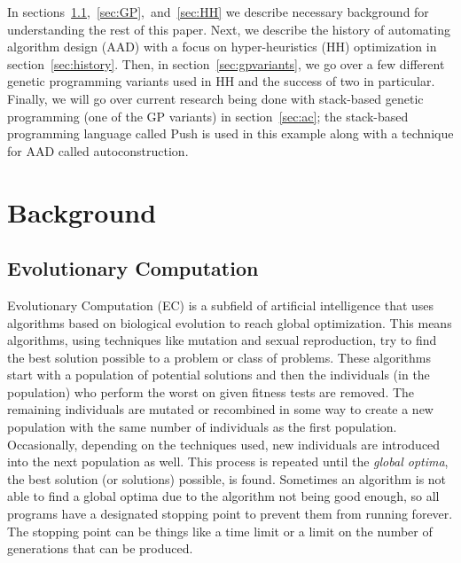 \documentclass{sig-alternate}
\begin{document}
In sections~\ref{sec:evocomp},~\ref{sec:GP},~and~\ref{sec:HH} we describe necessary background for understanding the rest of this paper. Next, we describe the history of automating algorithm design (AAD) with a focus on hyper-heuristics (HH) optimization in section~\ref{sec:history}. Then, in section~\ref{sec:gpvariants}, we go over a few different genetic programming variants used in HH and the success of two in particular. Finally, we will go over current research being done with stack-based genetic programming (one of the GP variants) in section~\ref{sec:ac}; the stack-based programming language called Push is used in this example along with a technique for AAD called autoconstruction.

\section{Background}
\label{sec:background}

\subsection{Evolutionary Computation}
\label{sec:evocomp}
Evolutionary Computation (EC) is a subfield of artificial intelligence that uses algorithms based on biological evolution to reach global optimization. This means algorithms, using techniques like mutation and sexual reproduction, try to find the best solution possible to a problem or class of problems. These algorithms start with a population of potential solutions and then the individuals (in the population) who perform the worst on given fitness tests are removed. The remaining individuals are mutated or recombined in some way to create a new population with the same number of individuals as the first population. Occasionally, depending on the techniques used, new individuals are introduced into the next population as well. This process is repeated until the \textit{global optima}, the best solution (or solutions) possible, is found. Sometimes an algorithm is not able to find a global optima due to the algorithm not being good enough, so all programs have a designated stopping point to prevent them from running forever. The stopping point can be things like a time limit or a limit on the number of generations that can be produced.
\end{document}
